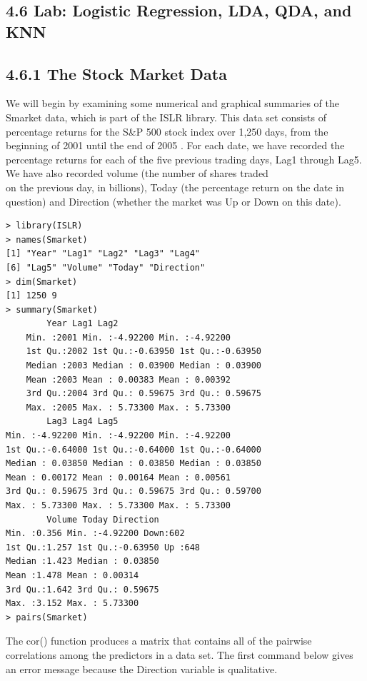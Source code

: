 \documentclass[10pt]{article}
\begin{document}
\subsection*{4.6 Lab: Logistic Regression, LDA, QDA, and KNN}
\subsection*{4.6.1 The Stock Market Data}
We will begin by examining some numerical and graphical summaries of the Smarket data, which is part of the ISLR library. This data set consists of percentage returns for the S\&P 500 stock index over 1,250 days, from the beginning of 2001 until the end of 2005 . For each date, we have recorded the percentage returns for each of the five previous trading days, Lag1 through Lag5. We have also recorded volume (the number of shares traded\\
on the previous day, in billions), Today (the percentage return on the date in question) and Direction (whether the market was Up or Down on this date).

\begin{verbatim}
> library(ISLR)
> names(Smarket)
[1] "Year" "Lag1" "Lag2" "Lag3" "Lag4"
[6] "Lag5" "Volume" "Today" "Direction"
> dim(Smarket)
[1] 1250 9
> summary(Smarket)
        Year Lag1 Lag2
    Min. :2001 Min. :-4.92200 Min. :-4.92200
    1st Qu.:2002 1st Qu.:-0.63950 1st Qu.:-0.63950
    Median :2003 Median : 0.03900 Median : 0.03900
    Mean :2003 Mean : 0.00383 Mean : 0.00392
    3rd Qu.:2004 3rd Qu.: 0.59675 3rd Qu.: 0.59675
    Max. :2005 Max. : 5.73300 Max. : 5.73300
        Lag3 Lag4 Lag5
Min. :-4.92200 Min. :-4.92200 Min. :-4.92200
1st Qu.:-0.64000 1st Qu.:-0.64000 1st Qu.:-0.64000
Median : 0.03850 Median : 0.03850 Median : 0.03850
Mean : 0.00172 Mean : 0.00164 Mean : 0.00561
3rd Qu.: 0.59675 3rd Qu.: 0.59675 3rd Qu.: 0.59700
Max. : 5.73300 Max. : 5.73300 Max. : 5.73300
        Volume Today Direction
Min. :0.356 Min. :-4.92200 Down:602
1st Qu.:1.257 1st Qu.:-0.63950 Up :648
Median :1.423 Median : 0.03850
Mean :1.478 Mean : 0.00314
3rd Qu.:1.642 3rd Qu.: 0.59675
Max. :3.152 Max. : 5.73300
> pairs(Smarket)
\end{verbatim}

The cor() function produces a matrix that contains all of the pairwise correlations among the predictors in a data set. The first command below gives an error message because the Direction variable is qualitative.
\end{document}
